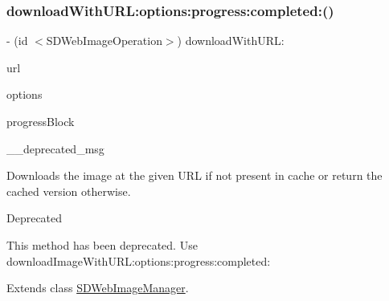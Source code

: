 \subsubsection{\texorpdfstring{download\+With\+U\+R\+L\+:options\+:progress\+:completed\+:()}{downloadWithURL:options:progress:completed:()}\hspace{0.1cm}{\footnotesize\ttfamily [2/3]}}
{\footnotesize\ttfamily -\/ (id $<$S\+D\+Web\+Image\+Operation$>$) download\+With\+U\+R\+L\+: \begin{DoxyParamCaption}\item[{(N\+S\+U\+RL $\ast$)}]{url }\item[{options:(S\+D\+Web\+Image\+Options)}]{options }\item[{progress:(S\+D\+Web\+Image\+Downloader\+Progress\+Block)}]{progress\+Block }\item[{completed:(\char`\"{}Method deprecated. Use \`{}download\+Image\+With\+U\+R\+L\+:options\+:progress\+:completed\+:\`{}\char`\"{})}]{\+\_\+\+\_\+deprecated\+\_\+msg }\end{DoxyParamCaption}}

Downloads the image at the given U\+RL if not present in cache or return the cached version otherwise.

\begin{DoxyRefDesc}{Deprecated}
\item[\mbox{\hyperlink{deprecated__deprecated000033}{Deprecated}}]This method has been deprecated. Use {\ttfamily download\+Image\+With\+U\+R\+L\+:options\+:progress\+:completed\+:} \end{DoxyRefDesc}


Extends class \mbox{\hyperlink{interface_s_d_web_image_manager_a6ed93377fa34b44c02bce84279529dad}{S\+D\+Web\+Image\+Manager}}.

\mbox{\label{category_s_d_web_image_manager_07_deprecated_08_a6ed93377fa34b44c02bce84279529dad}} 
